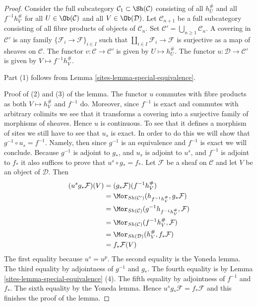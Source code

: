 \begin{proof}

Consider the full subcategory
$\mathcal{C}_1 \subset \Sh(\mathcal{C})$ consisting of all
$h_U^\#$ and all $f^{-1}h_V^\#$ for all
$U \in \Ob(\mathcal{C})$ and all $V \in \Ob(\mathcal{D})$.
Let $\mathcal{C}_{n + 1}$ be a full subcategory consisting of all
fibre products of objects of $\mathcal{C}_n$. Set
$\mathcal{C}' = \bigcup_{n \geq 1} \mathcal{C}_n$.
A covering in $\mathcal{C}'$ is any family
$\{\mathcal{F}_i \to \mathcal{F}\}_{i \in I}$ such that
$\coprod_{i \in I} \mathcal{F}_i \to \mathcal{F}$ is surjective
as a map of sheaves on $\mathcal{C}$.
The functor $v : \mathcal{C} \to \mathcal{C'}$ is given by
$U \mapsto h_U^\#$.
The functor $u : \mathcal{D} \to \mathcal{C'}$ is given by
$V \mapsto f^{-1}h_V^\#$.

\medskip\noindent
Part (1) follows from Lemma \ref{sites-lemma-special-equivalence}.

\medskip\noindent
Proof of (2) and (3) of the lemma. The functor $u$ commutes with fibre
products as both $V \mapsto h_V^\#$ and $f^{-1}$ do. Moreover,
since $f^{-1}$ is exact and commutes with arbitrary colimits we see
that it transforms a covering into a surjective family of morphisms of
sheaves. Hence $u$ is continuous. To see that it defines a morphism of
sites we still have to see that $u_s$ is exact. In order to do this
we will show that $g^{-1} \circ u_s = f^{-1}$. Namely, then since $g^{-1}$
is an equivalence and $f^{-1}$ is exact we will conclude.
Because $g^{-1}$ is adjoint to $g_*$, and $u_s$ is adjoint to
$u^s$, and $f^{-1}$ is adjoint to $f_*$ it also suffices to prove that
$u^s \circ g_* = f_*$. Let $\mathcal{F}$ be a sheaf on $\mathcal{C}$
and let $V$ be an object of $\mathcal{D}$. Then
\begin{align*}
(u^s g_{\ast}\mathcal{F})(V)
& =
(g_{\ast}\mathcal{F})(f^{-1}h_V^\#) \\
& =
\Mor_{Sh(\mathcal{C}')}(h_{f^{-1}h_V^\#},g_{\ast}\mathcal{F}) \\
& =
\Mor_{Sh(\mathcal{C})}(g^{-1}h_{f^{-1}h_V^\#},\mathcal{F}) \\
& =
\Mor_{Sh(\mathcal{C})}(f^{-1}h_V^\#,\mathcal{F}) \\
& =
\Mor_{Sh(\mathcal{D})}(h_V^\#,f_{\ast}\mathcal{F}) \\
& =
f_{\ast}\mathcal{F}(V)
\end{align*}
The first equality because $u^s = u^p$.
The second equality is the Yoneda lemma.
The third equality by adjointness of $g^{-1}$ and $g_*$.
The fourth equality is by Lemma \ref{sites-lemma-special-equivalence} (4).
The fifth equality by adjointness of $f^{-1}$ and $f_*$.
The sixth equality by the Yoneda lemma.
Hence $u^s g_*\mathcal{F} = f_*\mathcal{F}$ and
this finishes the proof of the lemma.
\end{proof}

